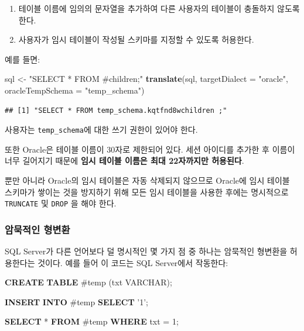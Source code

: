 \documentclass[11pt]{book}
\newenvironment{Shaded}{\begin{snugshade}}{\end{snugshade}}
\newcommand{\KeywordTok}[1]{\textcolor[rgb]{0.13,0.29,0.53}{\textbf{#1}}}
\newcommand{\DataTypeTok}[1]{\textcolor[rgb]{0.13,0.29,0.53}{#1}}
\newcommand{\DecValTok}[1]{\textcolor[rgb]{0.00,0.00,0.81}{#1}}
\newcommand{\StringTok}[1]{\textcolor[rgb]{0.31,0.60,0.02}{#1}}
\newcommand{\NormalTok}[1]{#1}
\providecommand{\tightlist}{%
  \setlength{\itemsep}{0pt}\setlength{\parskip}{0pt}}
\theoremstyle{definition}
\theoremstyle{definition}
\theoremstyle{definition}
\theoremstyle{remark}
\begin{document}
\begin{enumerate}
\def\labelenumi{\arabic{enumi}.}
\tightlist
\item
  테이블 이름에 임의의 문자열을 추가하여 다른 사용자의 테이블이 충돌하지
  않도록 한다.
\item
  사용자가 임시 테이블이 작성될 스키마를 지정할 수 있도록 허용한다.
\end{enumerate}

예를 들면:

\begin{Shaded}
\begin{Highlighting}[]
\NormalTok{sql <-}\StringTok{ "SELECT * FROM #children;"}
\KeywordTok{translate}\NormalTok{(sql, }\DataTypeTok{targetDialect =} \StringTok{"oracle"}\NormalTok{, }\DataTypeTok{oracleTempSchema =} \StringTok{"temp_schema"}\NormalTok{)}
\end{Highlighting}
\end{Shaded}

\begin{verbatim}
## [1] "SELECT * FROM temp_schema.kqtfnd8wchildren ;"
\end{verbatim}

사용자는 \texttt{temp\_schema}에 대한 쓰기 권한이 있어야 한다.

또한 Oracle은 테이블 이름이 30자로 제한되어 있다. 세션 아이디를 추가한
후 이름이 너무 길어지기 때문에 \textbf{임시 테이블 이름은 최대
22자까지만 허용된다}.

뿐만 아니라 Oracle의 임시 테이블은 자동 삭제되지 않으므로 Oracle에 임시
테이블 스키마가 쌓이는 것을 방지하기 위해 모든 임시 테이블을 사용한
후에는 명시적으로 \texttt{TRUNCATE} 및 \texttt{DROP} 을 해야 한다.

\subsubsection*{암묵적인 형변환}\label{-}

SQL Server가 다른 언어보다 덜 명시적인 몇 가지 점 중 하나는 암묵적인
형변환을 허용한다는 것이다. 예를 들어 이 코드는 SQL Server에서 작동한다:

\begin{Shaded}
\begin{Highlighting}[]
\KeywordTok{CREATE} \KeywordTok{TABLE}\NormalTok{ #temp (txt }\DataTypeTok{VARCHAR}\NormalTok{);}

\KeywordTok{INSERT} \KeywordTok{INTO}\NormalTok{ #temp}
\KeywordTok{SELECT} \StringTok{'1'}\NormalTok{;}

\KeywordTok{SELECT}\NormalTok{ * }\KeywordTok{FROM}\NormalTok{ #temp }\KeywordTok{WHERE}\NormalTok{ txt = }\DecValTok{1}\NormalTok{;}
\end{Highlighting}
\end{Shaded}
\end{document}
